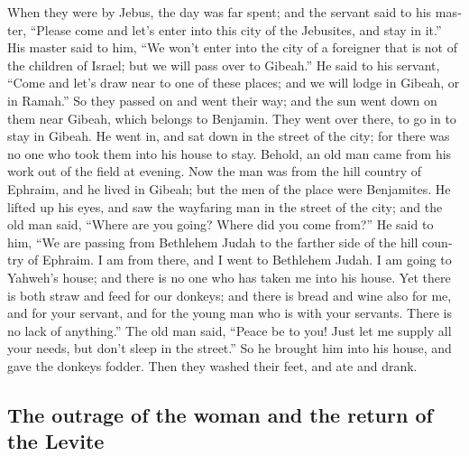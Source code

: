 \begin{paracol}{2}
\begin{otherlanguage}{english}
 When they were by Jebus, the day was far spent; and the
servant said to his master, ``Please come and let's enter into this city
of the Jebusites, and stay in it.''  His master said to
him, ``We won't enter into the city of a foreigner that is not of the
children of Israel; but we will pass over to Gibeah.'' 
He said to his servant, ``Come and let's draw near to one of these
places; and we will lodge in Gibeah, or in Ramah.''  So
they passed on and went their way; and the sun went down on them near
Gibeah, which belongs to Benjamin.  They went over there,
to go in to stay in Gibeah. He went in, and sat down in the street of
the city; for there was no one who took them into his house to stay.
 Behold, an old man came from his work out of the field
at evening. Now the man was from the hill country of Ephraim, and he
lived in Gibeah; but the men of the place were Benjamites.
 He lifted up his eyes, and saw the wayfaring man in the
street of the city; and the old man said, ``Where are you going? Where
did you come from?''  He said to him, ``We are passing
from Bethlehem Judah to the farther side of the hill country of Ephraim.
I am from there, and I went to Bethlehem Judah. I am going to Yahweh's
house; and there is no one who has taken me into his house.
 Yet there is both straw and feed for our donkeys; and
there is bread and wine also for me, and for your servant, and for the
young man who is with your servants. There is no lack of anything.''
 The old man said, ``Peace be to you! Just let me supply
all your needs, but don't sleep in the street.''  So he
brought him into his house, and gave the donkeys fodder. Then they
washed their feet, and ate and drank.

\hypertarget{the-outrage-of-the-woman-and-the-return-of-the-levite}{%
\subsection{The outrage of the woman and the return of the
Levite}\label{the-outrage-of-the-woman-and-the-return-of-the-levite}}


\end{otherlanguage}
\end{paracol}
